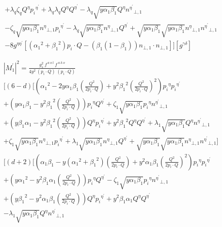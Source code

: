 \begin{equation}
\begin{split}
+\lambda_q\zeta_q {Q}^{\eta}{p_i}^{{\eta}^{\prime}}+\lambda_q\lambda_q{Q}^{\eta}{Q}^{{\eta}^{\prime}}-\lambda_q\sqrt{y\alpha_1\beta_1}{Q}^{\eta}{n^{{\eta}^{\prime}}}_{\bot,1}\\
-\zeta_q\sqrt{y\alpha_1\beta_1} {n^{{\eta}}}_{\bot,1}{p_i}^{{\eta}^{\prime}}-\lambda_q\sqrt{y\alpha_1\beta_1}{n^{{\eta}}}_{\bot,1}{Q}^{{\eta}^{\prime}}+\sqrt{y\alpha_1\beta_1}\sqrt{y\alpha_1\beta_1}{n^{{\eta}}}_{\bot,1}{n^{{\eta}^{\prime}}}_{\bot,1}\\
-8g^{{\eta}{{\eta}^{\prime}}}[({\alpha_1}^2+{\beta_1}^2) p_i \cdot Q - ({\beta_1}(1-\beta_1)){n}_{\bot,1}\cdot{n}_{\bot,1}]][g^{{\gamma}{{\delta}}}]
\end{split}
\end{equation}



\begin{equation}
\begin{split}
{|{M}^{\prime}_1|}^2 =\frac{g_s^2 \:f^{\:a\:o\:l}\: f^{\:a\:k\:o}}{4y^2\:(p_i\cdot Q) \:(p_i\cdot Q)} \\
[(6-d)[({\alpha_1}^2 -2y\alpha_1 \beta_1(\frac{Q^2}{2p_i \cdot Q})+y^2{\beta_1}^2(\frac{Q^2}{2p_i \cdot Q})^2) {p_i}^{\eta}{p_i}^{{\eta}^{\prime}}\\+(y\alpha_1\beta_1 -{y^2\beta_1}^2(\frac{Q^2}{2p_i \cdot Q})){p_i}^{\eta}{Q}^{{\eta}^{\prime}}+\zeta_1\sqrt{y\alpha_1\beta_1}{p_i}^{\eta}{n^{{\eta}^{\prime}}}_{\bot,1}\\
+(y\beta_1\alpha_1 -y^2{\beta_1}^2(\frac{Q^2}{2p_i \cdot Q})) {Q}^{\eta}{p_i}^{{\eta}^{\prime}}+y^2{\beta_1}^2{Q}^{\eta}{Q}^{{\eta}^{\prime}}+\lambda_1\sqrt{y\alpha_1\beta_1}{Q}^{\eta}{n^{{\eta}^{\prime}}}_{\bot,1}\\
+\zeta_1\sqrt{y\alpha_1\beta_1} {n^{{\eta}}}_{\bot,1}{p_i}^{{\eta}^{\prime}}+\lambda_1\sqrt{y\alpha_1\beta_1}{n^{{\eta}}}_{\bot,1}{Q}^{{\eta}^{\prime}}+\sqrt{y\alpha_1\beta_1}\sqrt{y\alpha_1\beta_1}{n^{{\eta}}}_{\bot,1}{n^{{\eta}^{\prime}}}_{\bot,1}]\\
[(d+2)[(\alpha_1\beta_1-y({\alpha_1}^2+{\beta_1}^2) (\frac{Q^2}{2p_i \cdot Q})+y^2{\alpha_1}{\beta_1}(\frac{Q^2}{2p_i \cdot Q})^2) {p_i}^{\eta}{p_i}^{{\eta}^{\prime}}\\+(y{\alpha_1}^2 -y^2\beta_1\alpha_1(\frac{Q^2}{2p_i \cdot Q})){p_i}^{\eta}{Q}^{{\eta}^{\prime}}-\zeta_1\sqrt{y\alpha_1\beta_1}{p_i}^{\eta}{n^{{\eta}^{\prime}}}_{\bot,1}\\
+(y{\beta_1}^2 -y^2\alpha_1 \beta_1(\frac{Q^2}{2p_i \cdot Q})) {Q}^{\eta}{p_i}^{{\eta}^{\prime}}+y^2\beta_1\alpha_1{Q}^{\eta}{Q}^{{\eta}^{\prime}}\\-\lambda_1\sqrt{y\alpha_1\beta_1}{Q}^{\eta}{n^{{\eta}^{\prime}}}_{\bot,1}

\end{split}
\end{equation}

